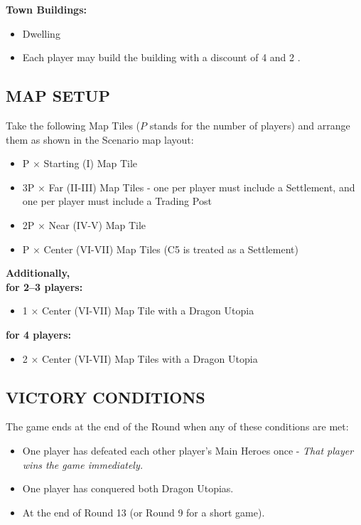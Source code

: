 \begin{multicols*}{2}
\textbf{Town Buildings:}
\begin{itemize}
  \item {} Dwelling
  \item Each player may build the  building with a discount of 4  and 2 . %
\end{itemize}

\subsection*{\MakeUppercase{Map Setup}}
Take the following Map Tiles ($P$ stands for the number of players) and arrange them as shown in the Scenario map layout:

\begin{itemize}
  \item P × Starting (I) Map Tile
  \item 3P × Far (II-III) Map Tiles - one per player must include a Settlement, and one per player must include a Trading Post
  \item 2P × Near (IV-V) Map Tile
  \item P × Center (VI-VII) Map Tiles (C5 is treated as a Settlement)
\end{itemize}

\textbf{Additionally,}\\
\textbf{for 2--3 players:}
\begin{itemize}
  \item 1 × Center (VI-VII) Map Tile with a Dragon Utopia
\end{itemize}

\textbf{for 4 players:}
\begin{itemize}
  \item 2 × Center (VI-VII) Map Tiles with a Dragon Utopia
\end{itemize}

\subsection*{\MakeUppercase{Victory Conditions}}
The game ends at the end of the Round when any of these conditions are met:

\begin{itemize}
 \item One player has defeated each other player's Main Heroes once - \textit{That player wins the game immediately.}
 \item One player has conquered both Dragon Utopias. %
 \item At the end of Round 13 (or Round 9 for a short game).
\end{itemize}


\end{multicols*}
